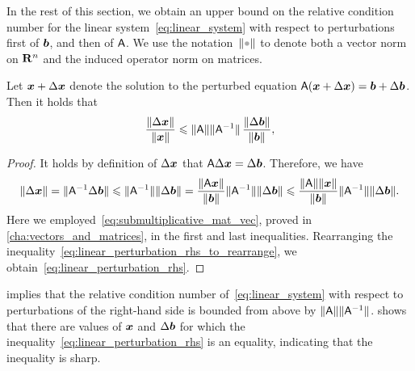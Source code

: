 In the rest of this section,
we obtain an upper bound on the relative condition number for the linear system~\eqref{eq:linear_system} with respect to perturbations first of $\mathbf{\boldsymbol{b}}$,
and then of $\mathsf A$.
We use the notation~$\norm{\placeholder}$ to denote both a vector norm on $\mathbf R^n$ and the induced operator norm on matrices.

\begin{proposition}
    \label{proposition:linear_perturbation_rhs}
    Let $\mathbf{\boldsymbol{x}} + \Delta \mathbf{\boldsymbol{x}}$ denote the solution to the perturbed equation $\mathsf A (\mathbf{\boldsymbol{x}} + \Delta \mathbf{\boldsymbol{x}}) = \mathbf{\boldsymbol{b}} + \Delta \mathbf{\boldsymbol{b}}$.
    Then it holds that
    \begin{equation}
        \label{eq:linear_perturbation_rhs}
        \frac{\lVert\Delta \mathbf{\boldsymbol{x}}\rVert}{\lVert\mathbf{\boldsymbol{x}}\rVert} \leqslant \lVert\mathsf A\rVert \lVert\mathsf A^{-1}\rVert \, \frac{\lVert\Delta \mathbf{\boldsymbol{b}}\rVert}{\lVert\mathbf{\boldsymbol{b}}\rVert},
    \end{equation}
\end{proposition}
\begin{proof}
    It holds by definition of $\Delta \mathbf{\boldsymbol{x}}$ that $\mathsf A \Delta \mathbf{\boldsymbol{x}} = \Delta \mathbf{\boldsymbol{b}}$.
    Therefore, we have
    \begin{equation}
        \label{eq:linear_perturbation_rhs_to_rearrange}
        \lVert\Delta \mathbf{\boldsymbol{x}}\rVert
        = \lVert\mathsf A^{-1} \Delta \mathbf{\boldsymbol{b}}\rVert
        \leqslant \lVert\mathsf A^{-1}\rVert \lVert\Delta \mathbf{\boldsymbol{b}}\rVert
        = \frac{\lVert\mathsf A \mathbf{\boldsymbol{x}}\rVert}{\lVert\mathbf{\boldsymbol{b}}\rVert} \lVert\mathsf A^{-1}\rVert \lVert\Delta \mathbf{\boldsymbol{b}}\rVert
        \leqslant \frac{\lVert\mathsf A\rVert \lVert\mathbf{\boldsymbol{x}}\rVert}{\lVert\mathbf{\boldsymbol{b}}\rVert} \lVert\mathsf A^{-1}\rVert \lVert\Delta \mathbf{\boldsymbol{b}}\rVert.
    \end{equation}
    Here we employed~\eqref{eq:submultiplicative_mat_vec},
    proved in \cref{cha:vectors_and_matrices},
    in the first and last inequalities.
    Rearranging the inequality~\eqref{eq:linear_perturbation_rhs_to_rearrange},
    we obtain~\eqref{eq:linear_perturbation_rhs}.
\end{proof}
 implies that
the relative condition number of~\eqref{eq:linear_system} with respect to perturbations of the right-hand side is bounded from above by $\lVert\mathsf A\rVert \lVert\mathsf A^{-1}\rVert$.
 shows that there are values of $\mathbf{\boldsymbol{x}}$ and $\Delta \mathbf{\boldsymbol{b}}$ for which the inequality~\eqref{eq:linear_perturbation_rhs} is an equality,
indicating that the inequality is sharp.

